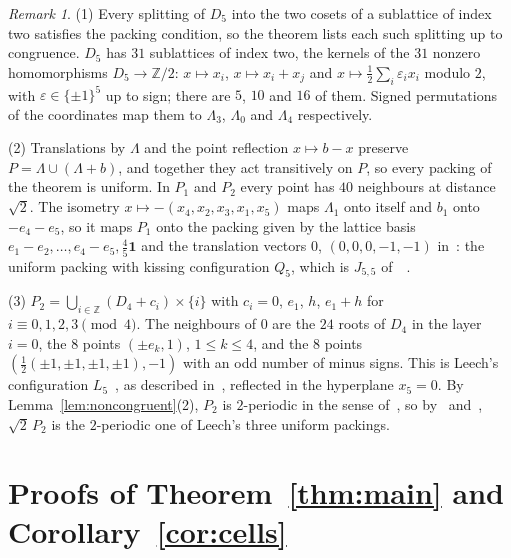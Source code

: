 \documentclass[11pt]{amsart}
\theoremstyle{definition}
\theoremstyle{remark}
\newtheorem{remark}[theorem]{Remark}
\numberwithin{equation}{section}
\numberwithin{table}{section}
\numberwithin{figure}{section}
\newcommand{\Z}{\mathbb{Z}}
\newcommand{\one}{\mathbf{1}}
\begin{document}
\begin{remark}\label{rem:identify}
(1) Every splitting of $D_5$ into the two cosets of a sublattice of index two satisfies the packing condition, so the theorem lists each such splitting up to congruence. $D_5$ has $31$ sublattices of index two, the kernels of the $31$ nonzero homomorphisms $D_5\to\Z/2$: $x\mapsto x_i$, $x\mapsto x_i+x_j$ and $x\mapsto\frac12\sum_i\varepsilon_ix_i$ modulo $2$, with $\varepsilon\in\{\pm1\}^5$ up to sign; there are $5$, $10$ and $16$ of them. Signed permutations of the coordinates map them to $\Lambda_3$, $\Lambda_0$ and $\Lambda_4$ respectively.

(2) Translations by $\Lambda$ and the point reflection $x\mapsto b-x$ preserve $P=\Lambda\cup(\Lambda+b)$, and together they act transitively on $P$, so every packing of the theorem is uniform. In $P_1$ and $P_2$ every point has $40$ neighbours at distance $\sqrt2$. The isometry $x\mapsto-(x_4,x_2,x_3,x_1,x_5)$ maps $\Lambda_1$ onto itself and $b_1$ onto $-e_4-e_5$, so it maps $P_1$ onto the packing given by the lattice basis $e_1-e_2,\dots,e_4-e_5,\frac45\one$ and the translation vectors $0$, $(0,0,0,-1,-1)$ in~\cite[Table~4.2]{CR2026}: the uniform packing with kissing configuration $Q_5$, which is $J_{5,5}$ of~\cite{AK2020}~\cite[\S1]{CR2026}.

(3) $P_2=\bigcup_{i\in\Z}(D_4+c_i)\times\{i\}$ with $c_i=0$, $e_1$, $h$, $e_1+h$ for $i\equiv0,1,2,3\pmod4$. The neighbours of $0$ are the $24$ roots of $D_4$ in the layer $i=0$, the $8$ points $(\pm e_k,1)$, $1\le k\le4$, and the $8$ points $(\frac12(\pm1,\pm1,\pm1,\pm1),-1)$ with an odd number of minus signs. This is Leech's configuration $L_5$~\cite{Leech1967}, as described in~\cite[\S2]{CR2026}, reflected in the hyperplane $x_5=0$. By Lemma~\ref{lem:noncongruent}(2), $P_2$ is $2$-periodic in the sense of~\cite{CR2026}, so by~\cite[Theorem~4.3]{CR2026} and~\cite[\S5]{CS1995}, $\sqrt2\,P_2$ is the $2$-periodic one of Leech's three uniform packings.
\end{remark}

\section{Proofs of Theorem~\ref{thm:main} and Corollary~\ref{cor:cells}}\label{sec:proofs}
\end{document}
